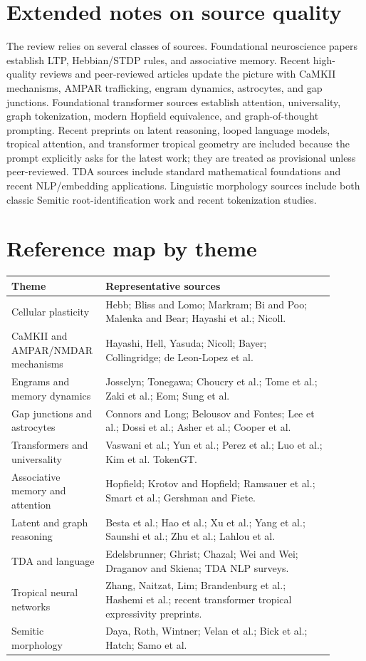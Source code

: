 \documentclass[11pt]{article}
\newcommand{\1}{\mathbf{1}}
\begin{document}
\section{Extended notes on source quality}

The review relies on several classes of sources. Foundational neuroscience papers establish LTP, Hebbian/STDP rules, and associative memory. Recent high-quality reviews and peer-reviewed articles update the picture with CaMKII mechanisms, AMPAR trafficking, engram dynamics, astrocytes, and gap junctions. Foundational transformer sources establish attention, universality, graph tokenization, modern Hopfield equivalence, and graph-of-thought prompting. Recent preprints on latent reasoning, looped language models, tropical attention, and transformer tropical geometry are included because the prompt explicitly asks for the latest work; they are treated as provisional unless peer-reviewed. TDA sources include standard mathematical foundations and recent NLP/embedding applications. Linguistic morphology sources include both classic Semitic root-identification work and recent tokenization studies.

\section{Reference map by theme}

\begin{longtable}{p{0.22\linewidth}p{0.68\linewidth}}
\toprule
Theme & Representative sources \\
\midrule
Cellular plasticity & Hebb; Bliss and Lomo; Markram; Bi and Poo; Malenka and Bear; Hayashi et al.; Nicoll. \\
CaMKII and AMPAR/NMDAR mechanisms & Hayashi, Hell, Yasuda; Nicoll; Bayer; Collingridge; de Leon-Lopez et al. \\
Engrams and memory dynamics & Josselyn; Tonegawa; Choucry et al.; Tome et al.; Zaki et al.; Eom; Sung et al. \\
Gap junctions and astrocytes & Connors and Long; Belousov and Fontes; Lee et al.; Dossi et al.; Asher et al.; Cooper et al. \\
Transformers and universality & Vaswani et al.; Yun et al.; Perez et al.; Luo et al.; Kim et al. TokenGT. \\
Associative memory and attention & Hopfield; Krotov and Hopfield; Ramsauer et al.; Smart et al.; Gershman and Fiete. \\
Latent and graph reasoning & Besta et al.; Hao et al.; Xu et al.; Yang et al.; Saunshi et al.; Zhu et al.; Lahlou et al. \\
TDA and language & Edelsbrunner; Ghrist; Chazal; Wei and Wei; Draganov and Skiena; TDA NLP surveys. \\
Tropical neural networks & Zhang, Naitzat, Lim; Brandenburg et al.; Hashemi et al.; recent transformer tropical expressivity preprints. \\
Semitic morphology & Daya, Roth, Wintner; Velan et al.; Bick et al.; Hatch; Samo et al. \\
\bottomrule
\end{longtable}
\end{document}
